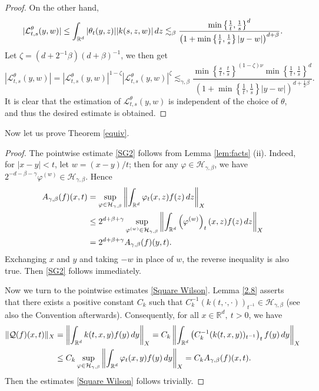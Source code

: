 \documentclass[oneside,english,a4wide]{amsart}
\numberwithin{equation}{section}
\numberwithin{figure}{section}
\theoremstyle{plain}
\theoremstyle{plain}
\theoremstyle{definition}
\theoremstyle{plain}
\theoremstyle{remark}
\theoremstyle{definition}
\theoremstyle{remark}
\theoremstyle{definition}
\newcommand{\real}{{\mathbb R}}
\renewcommand{\L}{{\mathcal L}}
\newcommand{\Q}{{\mathcal Q}}
\newcommand{\f}{\varphi}
\newcommand{\8}{+\infty}
\renewcommand{\1}{\mathbbm{1}}
\newcommand\norm[1]{ \left\| #1 \right\| }
\newcommand\sk[1]{ \left( #1 \right) }
\newcommand\lk[1]{ \left\{ #1 \right\} }
\renewcommand\d{{\rm d}}
\begin{document}
{\begin{proof}
    On the other hand,
    \[
        |\L^\theta_{t, s}(y, w)| \leq  \int_{\real^d} |\theta_t(y, z) ||k(s, z, w) |\, \d z  \lesssim_{\beta} \frac{ \min\lk{ \frac{1}{t}, \frac{1}{s} }^d }{ \sk{ 1 + \min\lk{ \frac{1}{t}, \frac{1}{s} }|y - w|}^{d + \beta} }.
    \]
Let $ \zeta = (d + 2^{-1}\beta )(d + \beta)^{-1}$, we then get
    \[
        |\L^\theta_{t, s}(y, w)| = |\L^\theta_{t, s}(y, w)|^{1-\zeta}|\L^\theta_{t, s}(y, w)|^\zeta \lesssim_{\gamma, \beta} \frac{ \min\lk{ \frac{s}{t}, \frac{t}{s} }^{ (1 - \zeta)\nu } \min\lk{ \frac{1}{t}, \frac{1}{s} }^d }{ \sk{ 1 + \min\lk{ \frac{1}{t}, \frac{1}{s} }|y - w|}^{d + \frac{1}{2}\beta} }.
    \]
    It is clear that the estimation of $\L^\theta_{t, s}(y, w)$ is independent of the choice of $\theta$, and thus the desired estimate is obtained.
\end{proof}



Now let us  prove Theorem \ref{equiv}.


\begin{proof}
The pointwise estimate \eqref{SG2} follows from Lemma \ref{lem:facts} (ii). Indeed, for $|x - y|< t$, let $w = (x - y)/t$; then for any $\f \in \mathcal{H}_{\gamma, \beta}$, we have $2^{-d - \beta -\gamma}\f^{(w)} \in \mathcal{H}_{\gamma, \beta}$. Hence
\[
\begin{aligned}
    A_{\gamma, \beta}(f)(x, t) & = \sup_{\f \in \mathcal{H}_{\gamma,\beta} } \norm{ \int_{\real^d} \f_t(x,z)f(z)\,\d z }_X\\
    & \leq 2^{d + \beta + \gamma}\sup_{\f^{(w)} \in \mathcal{H}_{\gamma,\beta} } \norm{ \int_{\real^d} \sk{\f^{(w)}}_t(x,z)f(z)\,\d z }_X \\
    & = 2^{d + \beta + \gamma}A_{\gamma, \beta}(f)(y, t).
\end{aligned}
\]
Exchanging $x$ and $y$ and taking $-w$ in place of $w$, the reverse inequality is also true. Then \eqref{SG2} follows immediately.

Now we turn to the pointwise estimates \eqref{Square Wilson}.
Lemma \ref{2.8} asserts that there exists a positive constant $C_k$ such that $ C_k^{-1}(k(t, \cdot, \cdot))_{t^{-1}} \in \mathcal{H}_{\gamma, \beta} $ (see also the {Convention} afterwards). Consequently, for all $x\in \real^d, \ t>0$, we have
\begin{equation}\label{Qf-Af}
\begin{aligned}
    \| \Q(f)(x, t) \|_X & = \norm{ \int_{\real^d} k(t, x, y)f(y)\,\d y }_X = C_k\norm{ \int_{\real^d} \sk{ C_k^{-1}(k(t, x, y))_{t^{-1}} }_tf(y)\,\d y }_X\\
    & \leq C_k \sup_{\f \in \mathcal{H}_{\gamma, \beta} }\norm{ \int_{\real^d} \f_t(x, y)f(y)\,\d y }_X = C_k A_{\gamma, \beta}(f)(x, t).
\end{aligned}
\end{equation}
Then the estimates \eqref{Square Wilson} follows trivially.


\end{proof}}
\end{document}
